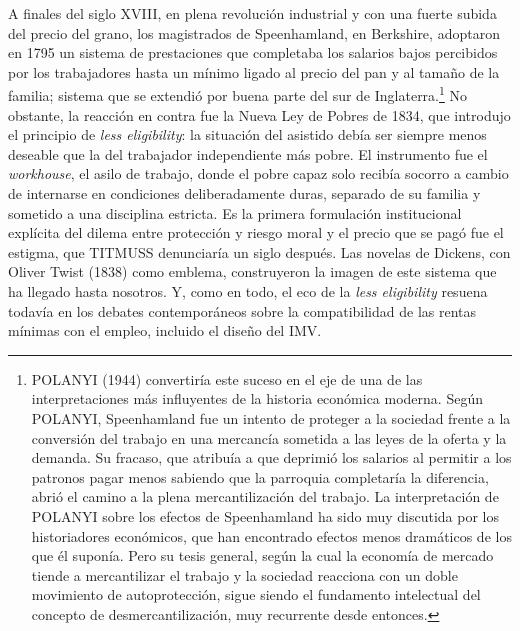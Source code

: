 \documentclass[10pt,a4paper]{article}
\begin{document}
A finales del siglo XVIII, en plena revolución industrial y con una fuerte subida del precio del grano, los magistrados de Speenhamland, en Berkshire, adoptaron en 1795 un sistema de prestaciones que completaba los salarios bajos percibidos por los trabajadores hasta un mínimo ligado al precio del pan y al tamaño de la familia; sistema que se extendió por buena parte del sur de Inglaterra.\footnote{%
    POLANYI (1944) convertiría este suceso en el eje de una de las interpretaciones más influyentes de la historia económica moderna. Según POLANYI, Speenhamland fue un intento de proteger a la sociedad frente a la conversión del trabajo en una mercancía sometida a las leyes de la oferta y la demanda. Su fracaso, que atribuía a que deprimió los salarios al permitir a los patronos pagar menos sabiendo que la parroquia completaría la diferencia, abrió el camino a la plena mercantilización del trabajo. La interpretación de POLANYI sobre los efectos de Speenhamland ha sido muy discutida por los historiadores económicos, que han encontrado efectos menos dramáticos de los que él suponía. Pero su tesis general, según la cual la economía de mercado tiende a mercantilizar el trabajo y la sociedad reacciona con un doble movimiento de autoprotección, sigue siendo el fundamento intelectual del concepto de desmercantilización, muy recurrente desde entonces.
} No obstante, la reacción en contra fue la Nueva Ley de Pobres de 1834, que introdujo el principio de \textit{less eligibility}: la situación del asistido debía ser siempre menos deseable que la del trabajador independiente más pobre. El instrumento fue el \textit{workhouse}, el asilo de trabajo, donde el pobre capaz solo recibía socorro a cambio de internarse en condiciones deliberadamente duras, separado de su familia y sometido a una disciplina estricta. Es la primera formulación institucional explícita del dilema entre protección y riesgo moral y el precio que se pagó fue el estigma, que TITMUSS denunciaría un siglo después. Las novelas de Dickens, con Oliver Twist (1838) como emblema, construyeron la imagen de este sistema que ha llegado hasta nosotros. Y, como en todo, el eco de la \textit{less eligibility} resuena todavía en los debates contemporáneos sobre la compatibilidad de las rentas mínimas con el empleo, incluido el diseño del IMV.
\end{document}
